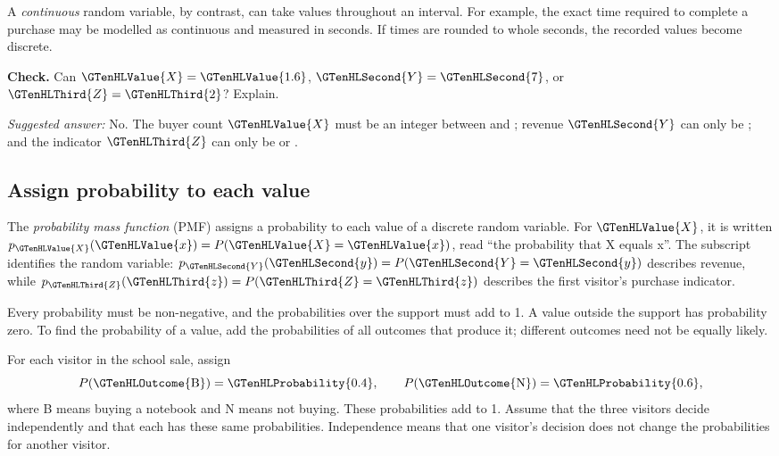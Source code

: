 A \emph{continuous} random variable, by contrast, can take values throughout an interval. For example, the exact time required to complete a purchase may be modelled as continuous and measured in seconds. If times are rounded to whole seconds, the recorded values become discrete.

\textbf{Check.} Can $\GTenHLValue{X}=\GTenHLValue{1.6}$, $\GTenHLSecond{Y}=\GTenHLSecond{7}$, or $\GTenHLThird{Z}=\GTenHLThird{2}$? Explain.

\emph{Suggested answer:} No. The buyer count $\GTenHLValue{X}$ must be an integer between  and ; revenue $\GTenHLSecond{Y}$ can only be ; and the indicator $\GTenHLThird{Z}$ can only be  or .


\subsection{Assign probability to each value}
\label{subsec:t2-c1-assign-probability-to-each-value}

The \emph{probability mass function} (PMF) assigns a probability to each value of a discrete random variable. For $\GTenHLValue{X}$, it is written $p_{\GTenHLValue{X}}(\GTenHLValue{x})=P(\GTenHLValue{X}=\GTenHLValue{x})$, read ``the probability that X equals x''. The subscript identifies the random variable: $p_{\GTenHLSecond{Y}}(\GTenHLSecond{y})=P(\GTenHLSecond{Y}=\GTenHLSecond{y})$ describes revenue, while $p_{\GTenHLThird{Z}}(\GTenHLThird{z})=P(\GTenHLThird{Z}=\GTenHLThird{z})$ describes the first visitor's purchase indicator.

Every probability must be non-negative, and the probabilities over the support must add to 1. A value outside the support has probability zero. To find the probability of a value, add the probabilities of all outcomes that produce it; different outcomes need not be equally likely.

For each visitor in the school sale, assign
\[
P(\GTenHLOutcome{\mathrm{B}})=\GTenHLProbability{0.4},\qquad P(\GTenHLOutcome{\mathrm{N}})=\GTenHLProbability{0.6},
\]
where B means buying a notebook and N means not buying. These probabilities add to 1. Assume that the three visitors decide independently and that each has these same probabilities. Independence means that one visitor's decision does not change the probabilities for another visitor.

